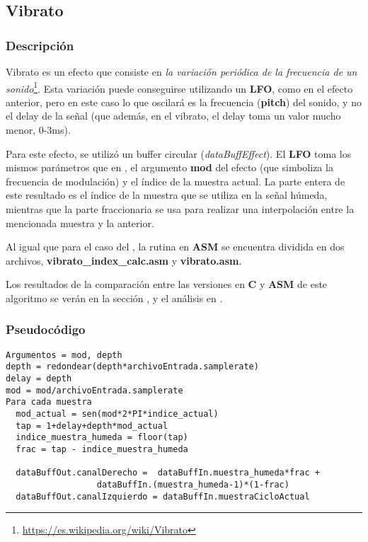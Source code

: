 \subsection{Vibrato}
\label{subsec:desarrollo-vibrato}

\subsubsection{Descripción}
\label{subsec:desarrollo-vibrato-desc}

Vibrato es un efecto que consiste en \textit{la variación periódica de la frecuencia de un sonido}\footnote{\url{https://es.wikipedia.org/wiki/Vibrato}}. Esta variación puede conseguirse utilizando un \textbf{LFO}, como en el efecto anterior, pero en este caso lo que oscilará es la frecuencia (\textbf{pitch}) del sonido, y no el delay de la señal (que además, en el vibrato, el delay toma un valor mucho menor, 0-3ms). 

Para este efecto, se utilizó un buffer circular (\textit{dataBuffEffect}). El \textbf{LFO} toma los mismos parámetros que en , el argumento \textbf{mod} del efecto (que simboliza la frecuencia de modulación) y el índice de la muestra actual. La parte entera de este resultado es el índice de la muestra que se utiliza en la señal húmeda, mientras que la parte fraccionaria se usa para realizar una interpolación entre la mencionada muestra y la anterior.

Al igual que para el caso del , la rutina en \textbf{ASM} se encuentra dividida en dos archivos, \textbf{vibrato\_index\_calc.asm} y \textbf{vibrato.asm}.

\vspace{\baselineskip}

Los resultados de la comparación entre las versiones en \textbf{C} y \textbf{ASM} de este algoritmo se verán en la sección , y el análisis en .

\subsubsection{Pseudocódigo}
\label{subsec:desarrollo-vibrato-code}

\lstset{language=C}
\begin{lstlisting}[frame=single]
Argumentos = mod, depth
depth = redondear(depth*archivoEntrada.samplerate)
delay = depth
mod = mod/archivoEntrada.samplerate
Para cada muestra
  mod_actual = sen(mod*2*PI*indice_actual)
  tap = 1+delay+depth*mod_actual
  indice_muestra_humeda = floor(tap)
  frac = tap - indice_muestra_humeda

  dataBuffOut.canalDerecho =  dataBuffIn.muestra_humeda*frac + 
			      dataBuffIn.(muestra_humeda-1)*(1-frac)
  dataBuffOut.canalIzquierdo = dataBuffIn.muestraCicloActual
\end{lstlisting}

